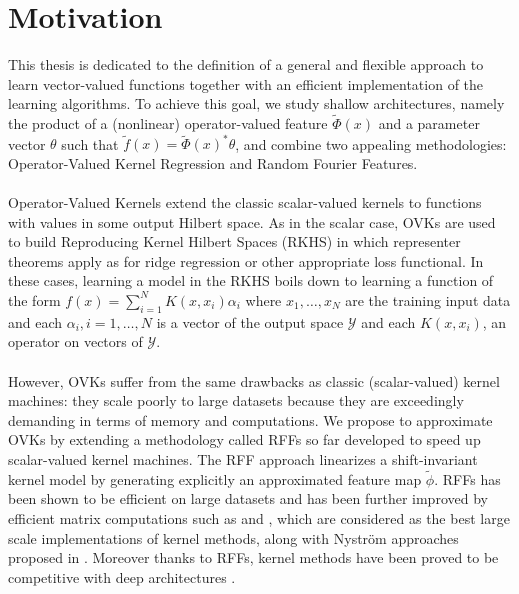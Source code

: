 \section{Motivation}
This thesis is dedicated to the definition of a general and flexible approach
to learn vector-valued functions together with an efficient implementation of
the learning algorithms. To achieve this goal, we study shallow architectures,
namely the product of a (nonlinear) operator-valued feature $\tilde{\Phi}(x)$
and a parameter vector $\theta$ such that $\tilde{f}(x) = \tilde{\Phi}(x)^*
\theta$, and combine two appealing methodologies: Operator-Valued Kernel
Regression and Random Fourier Features.
\paragraph{}
Operator-Valued Kernels \citep{Micchelli2005,Carmeli2010,Kadri_aistat10,
Brouard2011,Alvarez2012} extend the classic scalar-valued kernels to functions
with values in some output Hilbert space. As in the scalar case, \acfp{OVK} are
used to build Reproducing Kernel Hilbert Spaces (\acs{RKHS}) in which
representer theorems apply as for ridge regression or other appropriate loss
functional. In these cases, learning a model in the \acs{RKHS} boils down to
learning a function of the form $f(x)=\sum_{i=1}^N K(x,x_i)\alpha_i$ where
$x_1, \ldots, x_N$ are the training input data and each $\alpha_i, i=1, \ldots,
N$ is a vector of the output space $\mathcal{Y}$ and each $K(x,x_i)$, an
operator on vectors of $\mathcal{Y}$.
\paragraph{}
However, \acsp{OVK} suffer from the same drawbacks as classic (scalar-valued)
kernel machines: they scale poorly to large datasets because they are
exceedingly demanding in terms of memory and computations. We propose to
approximate OVKs by extending a methodology called \acfp{RFF}
\citep{Rahimi2007, Le2013, Yang2015, sriper2015, Bach2015, sutherland2015,
rudi2016generalization} so far developed to speed up scalar-valued kernel
machines. The \acs{RFF} approach linearizes a shift-invariant kernel model by
generating explicitly an approximated feature map $\tilde{\phi}$. \acsp{RFF}
has been shown to be efficient on large datasets and has been further improved
by efficient matrix computations such as \citep[``FastFood'']{Le2013} and
\citep[``SORF'']{felix2016orthogonal}, which are considered as the best large
scale implementations of kernel methods, along with Nystr\"om approaches
proposed in \citet{drineas2005nystrom}. Moreover thanks to \acsp{RFF}, kernel
methods have been proved to be competitive with deep architectures
\citep{lu2014scale, dai2014scalable, yang2015deep}.

